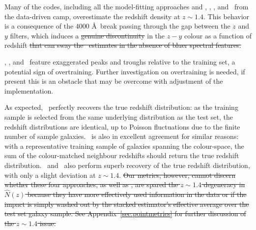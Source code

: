 Many of the codes, including all the model-fitting approaches and \annz, \gpz, \metaphor, and \skynet\ from the data-driven camp, overestimate the redshift density at $z \sim 1.4$.
This behavior is a consequence of the $4000$ \AA\ break passing through the gap between the $z$ and $y$ filters, which induces a \sout{genuine discontinuity} in the $z - y$ colour as a function of redshift \sout{that can sway the \pzpdf\ estimates in the absence of bluer spectral features.}

\annz, \gpz, and \metaphor\ feature exaggerated peaks and troughs relative to the training set, a potential sign of overtraining.
Further investigation on overtraining is needed, if present this is an obstacle that may be overcome with adjustment of the implementation.

As expected, \trainz\ perfectly recovers the true redshift distribution: as the training sample is selected from the same underlying distribution as the test set, the redshift distributions are identical, up to Poisson fluctuations due to the finite number of sample galaxies.
\cmnn\ is also in excellent agreement for similar reasons: with a representative training sample of galaxies spanning the colour-space, the sum of the colour-matched neighbour redshifts should return the true redshift distribution.
\flexzboost\ and \tpz\ also perform superb recovery of the true redshift distribution, with only a slight deviation at $z \sim 1.4$.
\sout{Our metrics, however, cannot discern whether these four approaches, as well as \delight, are spared the $z \sim 1.4$ degeneracy in $\hat{N}(z)$ because they have more effectively used information in the data or if the impact is simply washed out by the stacked estimator's effective average over the test set galaxy sample.
See Appendix~\ref{sec:pointmetrics} for further discussion of the $z \sim 1.4$ issue.}

